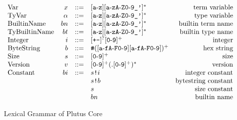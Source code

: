 \documentclass[../main.tex]{subfiles}
\begin{document}
\begin{figure*}[t]
    \centering
    \[\begin{array}{lrclr}
        \textrm{Var}     & x  & ::= & [\texttt{a}\!\hyphen{}\!\texttt{z}][\texttt{a}\!\hyphen{}\!\texttt{zA}\!\hyphen{}\!\texttt{Z0}\!\hyphen{}\!\texttt{9\_'}]^*                                                           & \textrm{term variable}\\
        \textrm{TyVar}   & \alpha & ::= & [\texttt{a}\!\hyphen{}\!\texttt{z}][\texttt{a}\!\hyphen{}\!\texttt{zA}\!\hyphen{}\!\texttt{Z0}\!\hyphen{}\!\texttt{9\_'}]^*                                                      & \textrm{type variable}\\
        \textrm{BuiltinName}    & bn  & ::= & [\texttt{a}\!\hyphen{}\!\texttt{z}][\texttt{a}\!\hyphen{}\!\texttt{zA}\!\hyphen{}\!\texttt{Z0}\!\hyphen{}\!\texttt{9\_'}]^*                                                          & \textrm{builtin term name}\\
        \textrm{TyBuiltinName}    & bt  & ::= & [\texttt{a}\!\hyphen{}\!\texttt{z}][\texttt{a}\!\hyphen{}\!\texttt{zA}\!\hyphen{}\!\texttt{Z0}\!\hyphen{}\!\texttt{9\_'}]^* & \textrm{builtin type name}\\
        \textrm{Integer} & i  & ::= & [\texttt{+-}]^?[\texttt{0}\!\hyphen{}\!\texttt{9}]^+                                                                                                                                  & \textrm{integer}\\
        \textrm{ByteString}   & b  & ::= & \texttt{\#}([\texttt{a}\!\hyphen{}\!\texttt{fA}\!\hyphen{}\!\texttt{F0}\!\hyphen{}\!\texttt{9}][\texttt{a}\!\hyphen{}\!\texttt{fA}\!\hyphen{}\!\texttt{F0}\!\hyphen{}\!\texttt{9}])^+ & \textrm{hex string}\\
        \textrm{Size} & s  & ::= & [\texttt{0}\!\hyphen{}\!\texttt{9}]^+ & \textrm{size}\\
        \textrm{Version} & v & ::= & [\texttt{0}\!\hyphen{}\!\texttt{9}]^+(.[\texttt{0}\!\hyphen{}\!\texttt{9}]^+)^* & \textrm{version}\\
        \textrm{Constant} & bi & ::= & \sizedBuiltin{s}{i} & \textrm{integer constant}\\
                          &    &     & \sizedBuiltin{s}{b} & \textrm{bytestring constant}\\
                          &    &     & s & \textrm{size constant}\\
                          &    &     & bn & \textrm{builtin name}\\
        
    \end{array}\]
    \caption{Lexical Grammar of Plutus Core}
    \label{fig:Plutus_core_lexical_grammar}
\end{figure*}
\end{document}
